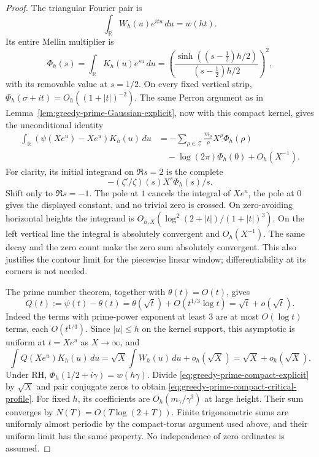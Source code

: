 \documentclass[11pt]{article}
\theoremstyle{definition}
\begin{document}
\begin{proof}
The triangular Fourier pair is
\[
 \int_{\mathbb R}W_h(u)e^{itu}\,du=w(ht).
\]
Its entire Mellin multiplier is
\[
 \Phi_h(s)=\int_{\mathbb R}K_h(u)e^{su}\,du
 =\left(\frac{\sinh((s-\tfrac12)h/2)}
                  {(s-\tfrac12)h/2}\right)^2,
\]
with its removable value at $s=1/2$.
On every fixed vertical strip,
$\Phi_h(\sigma+it)=O_h((1+|t|)^{-2})$.
The same Perron argument as in
Lemma~\ref{lem:greedy-prime-Gaussian-explicit}, now with this compact
kernel, gives the unconditional identity
\begin{equation}
 \begin{aligned}
 \int_{\mathbb R}(\psi(Xe^u)-Xe^u)K_h(u)\,du
 &=-\sum_{\rho\in\mathcal Z}
       \frac{m_\rho}{\rho}X^\rho\Phi_h(\rho)\\
 &\quad-\log(2\pi)\Phi_h(0)+O_h(X^{-1}).
 \end{aligned}
 \label{eq:greedy-prime-compact-explicit}
\end{equation}
For clarity, its initial integrand on $\Re s=2$ is the complete
\[
                     -(\zeta'/\zeta)(s)X^s\Phi_h(s)/s .
\]
Shift only to $\Re s=-1$.
The pole at $1$ cancels the integral of $Xe^u$, the pole at $0$
gives the displayed constant, and no trivial zero is crossed.
On zero-avoiding horizontal heights the integrand is
$O_{h,X}(\log^2(2+|t|)/(1+|t|)^3)$.
On the left vertical line the integral is absolutely convergent and
$O_h(X^{-1})$. The same decay and the zero count make the zero sum
absolutely convergent. This also justifies the contour limit for
the piecewise linear window; differentiability at its corners is
not needed.

The prime number theorem, together with $\theta(t)=O(t)$, gives
\[
 Q(t):=\psi(t)-\theta(t)
   =\theta(\sqrt t)+O(t^{1/3}\log t)
   =\sqrt t+o(\sqrt t).
\]
Indeed the terms with prime-power exponent at least $3$ are at most
$O(\log t)$ terms, each $O(t^{1/3})$.
Since $|u|\le h$ on the kernel support, this asymptotic is uniform
at $t=Xe^u$ as $X\to\infty$, and
\[
 \int Q(Xe^u)K_h(u)\,du
       =\sqrt X\int W_h(u)\,du+o_h(\sqrt X)
       =\sqrt X+o_h(\sqrt X).
\]
Under RH, $\Phi_h(1/2+i\gamma)=w(h\gamma)$.
Divide \eqref{eq:greedy-prime-compact-explicit} by $\sqrt X$ and
pair conjugate zeros to obtain
\eqref{eq:greedy-prime-compact-critical-profile}.
For fixed $h$, its coefficients are $O_h(m_\gamma/\gamma^3)$
at large height. Their sum converges by
$N(T)=O(T\log(2+T))$.
Finite trigonometric sums are uniformly almost periodic by the
compact-torus argument used above, and their uniform limit has
the same property. No independence of zero ordinates is assumed.
\end{proof}
\end{document}
